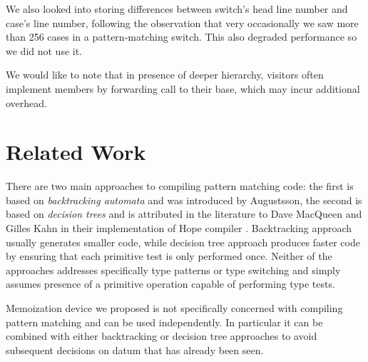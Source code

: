 \documentclass[preprint]{sigplanconf}
\begin{document}
We also looked into storing differences between switch's head line number and 
case's line number, following the observation that very occasionally we saw more 
than 256 cases in a pattern-matching switch. This also degraded performance so 
we did not use it.

We would like to note that in presence of deeper hierarchy, visitors often 
implement members by forwarding call to their base, which may incur additional 
overhead.

\section{Related Work} %
\label{sec:rw}

There are two main approaches to compiling pattern matching code: the first is 
based on \emph{backtracking automata} and was introduced by Augustsson\cite{}, 
the second is based on \emph{decision trees} and is attributed in the literature 
to Dave MacQueen and Gilles Kahn in their implementation of Hope compiler \cite{}.
Backtracking approach usually generates smaller code, while decision tree 
approach produces faster code by ensuring that each primitive test is only 
performed once. Neither of the approaches addresses specifically type patterns 
or type switching and simply assumes presence of a primitive operation capable 
of performing type tests.

Memoization device we proposed is not specifically concerned with compiling 
pattern matching and can be used independently. In particular it can be combined 
with either backtracking or decision tree approaches to avoid subsequent 
decisions on datum that has already been seen.

\end{document}

